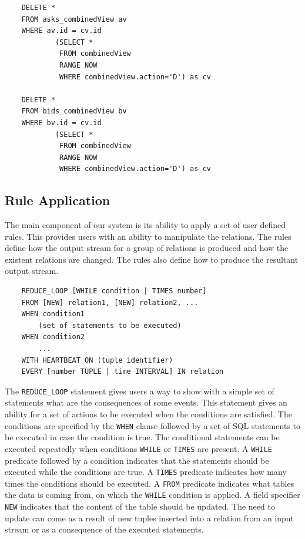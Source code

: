 \documentclass{article}
\begin{document}
\begin{verbatim}  
    DELETE *
    FROM asks_combinedView av
    WHERE av.id = cv.id
            (SELECT * 
             FROM combinedView
             RANGE NOW
             WHERE combinedView.action='D') as cv  

    DELETE *
    FROM bids_combinedView bv
    WHERE bv.id = cv.id
            (SELECT * 
             FROM combinedView
             RANGE NOW
             WHERE combinedView.action='D') as cv 
\end{verbatim}


\subsection{Rule Application}

The main component of our system is its ability to apply a set of user defined rules. This provides users with an ability to manipulate the relations. The rules define how the output stream for a group of relations is produced and how the existent relations are changed. The rules also define how to produce the resultant output stream. 

\begin{verbatim}
    REDUCE_LOOP [WHILE condition | TIMES number]
    FROM [NEW] relation1, [NEW] relation2, ... 
    WHEN condition1
        (set of statements to be executed)
    WHEN condition2
        ...
    WITH HEARTBEAT ON (tuple identifier)
    EVERY [number TUPLE | time INTERVAL] IN relation 
\end{verbatim}

The {\tt REDUCE\_LOOP} statement gives users a way to show with a simple set of statements what are the consequences of some events. This statement gives an ability for a set of actions to be executed when the conditions are satisfied. The conditions are specified by the {\tt WHEN} clause followed by a set of SQL statements to be executed in case the condition is true. The conditional statements can be executed repeatedly when conditions {\tt WHILE} or {\tt TIMES} are present. A {\tt WHILE} predicate followed by a condition indicates that the statements should be executed while the conditions are true. A {\tt TIMES} predicate indicates how many times the conditions should be executed. A {\tt FROM} predicate indicates what tables the data is coming from, on which the {\tt WHILE} condition is applied. A field specifier {\tt NEW} indicates that the content of the table should be updated. The need to update can come as a result of new tuples inserted into a relation from an input stream or as a consequence of the executed statements.   
\end{document}
